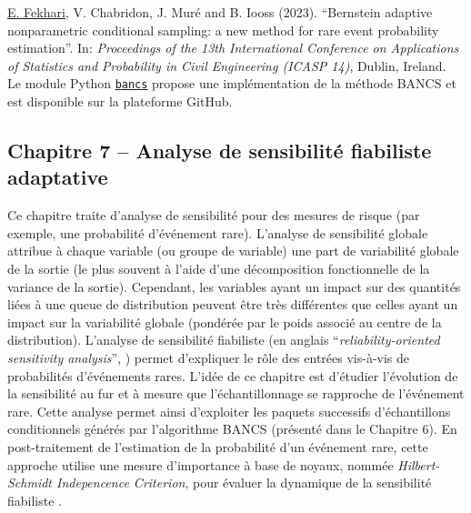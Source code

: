 \noindent
{} \underline{E. Fekhari}, V. Chabridon, J. Muré and B. Iooss (2023). ``Bernstein adaptive nonparametric conditional sampling: a new method for rare event probability estimation''. In: \textit{Proceedings of the 13th International Conference on Applications of Statistics and Probability in Civil Engineering (ICASP 14)}, Dublin, Ireland.\\

\noindent
{} Le module Python \href{https://github.com/efekhari27/bancs}{\texttt{bancs}} propose une implémentation de la méthode BANCS et est disponible sur la plateforme GitHub. 

\subsection*{Chapitre 7 -- Analyse de sensibilité fiabiliste adaptative}

Ce chapitre traite d'analyse de sensibilité pour des mesures de risque (par exemple, une probabilité d'événement rare). 
L'analyse de sensibilité globale \cite{daveiga_iooss_2021} attribue à chaque variable (ou groupe de variable) une part de variabilité globale de la sortie (le plus souvent à l'aide d'une décomposition fonctionnelle de la variance de la sortie). 
Cependant, les variables ayant un impact sur des quantités liées à une queue de distribution peuvent être très différentes que celles ayant un impact sur la variabilité globale (pondérée par le poids associé au centre de la distribution). 
L'analyse de sensibilité fiabiliste (en anglais ``\textit{reliability-oriented sensitivity analysis}'', \cite{chabridon_2018_thesis}) permet d'expliquer le rôle des entrées vis-à-vis de probabilités d'événements rares. 
L'idée de ce chapitre est d'étudier l'évolution de la sensibilité au fur et à mesure que l'échantillonnage se rapproche de l'événement rare. 
Cette analyse permet ainsi d'exploiter les paquets successifs d'échantillons conditionnels générés par l'algorithme BANCS (présenté dans le Chapitre 6). 
En post-traitement de l'estimation de la probabilité d'un événement rare, cette approche utilise une mesure d'importance à base de noyaux, nommée \textit{Hilbert-Schmidt Indepencence Criterion}, pour évaluer la dynamique de la sensibilité fiabiliste \cite{marrel_chabridon_2021}.


